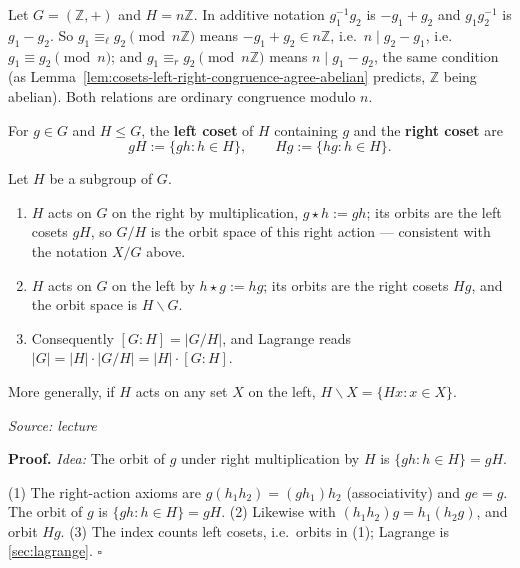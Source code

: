 \documentclass[11pt]{report}
\renewenvironment{proof}[1][Proof]{\noindent\textbf{#1.} }{\hfill$\square$\par\vspace{5pt}}
\newcommand{\srcline}[1]{\par\hfill{\footnotesize\textit{Source: #1}}}
\begin{document}
\begin{exbox}\label{ex:cosets-congruence-modulo-nz}
Let $G = (\mathbb{Z}, +)$ and $H = n\mathbb{Z}$. In additive notation $g_1^{-1}g_2$ is $-g_1 + g_2$ and $g_1g_2^{-1}$ is $g_1 - g_2$. So $g_1 \equiv_\ell g_2 \pmod{n\mathbb{Z}}$ means $-g_1 + g_2 \in n\mathbb{Z}$, i.e.\ $n \mid g_2 - g_1$, i.e.\ $g_1 \equiv g_2 \pmod n$; and $g_1 \equiv_r g_2 \pmod{n\mathbb{Z}}$ means $n \mid g_1 - g_2$, the same condition (as Lemma~\ref{lem:cosets-left-right-congruence-agree-abelian} predicts, $\mathbb{Z}$ being abelian). Both relations are ordinary congruence modulo $n$.
\end{exbox}

\begin{defbox}\label{def:left-right-cosets}
For $g \in G$ and $H \leq G$, the \textbf{left coset} of $H$ containing $g$ and the \textbf{right coset} are
\[ gH := \{ gh : h \in H \}, \qquad Hg := \{ hg : h \in H \}. \]
\end{defbox}

\begin{propbox}\label{prop:cosets-orbits}
Let $H$ be a subgroup of $G$.
\begin{enumerate}
    \item $H$ acts on $G$ on the right by multiplication, $g \star h := gh$; its orbits are the left cosets $gH$, so $G/H$ is the orbit space of this right action --- consistent with the notation $X/G$ above.
    \item $H$ acts on $G$ on the left by $h \star g := hg$; its orbits are the right cosets $Hg$, and the orbit space is $H \backslash G$.
    \item Consequently $[G : H] = |G/H|$, and Lagrange reads $|G| = |H| \cdot |G/H| = |H| \cdot [G : H]$.
\end{enumerate}
More generally, if $H$ acts on any set $X$ on the left, $H \backslash X = \{Hx : x \in X\}$.
\srcline{lecture}
\end{propbox}

\begin{proof}
\textit{Idea:} The orbit of $g$ under right multiplication by $H$ is $\{gh : h \in H\} = gH$.\par
(1) The right-action axioms are $g(h_1h_2) = (gh_1)h_2$ (associativity) and $ge = g$. The orbit of $g$ is $\{gh : h \in H\} = gH$. (2) Likewise with $(h_1h_2)g = h_1(h_2g)$, and orbit $Hg$. (3) The index counts left cosets, i.e.\ orbits in (1); Lagrange is \ref{sec:lagrange}.
\end{proof}
\end{document}
